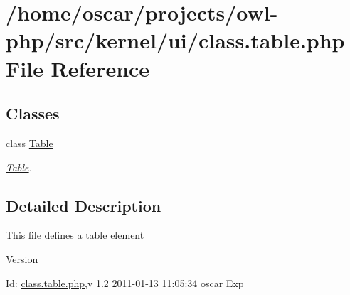 \section{/home/oscar/projects/owl-\/php/src/kernel/ui/class.table.php File Reference}
\label{class_8table_8php}
\subsection*{Classes}
\begin{DoxyCompactItemize}
\item 
class \hyperlink{classTable}{Table}
\begin{DoxyCompactList}\small\item\em \hyperlink{classTable}{Table}. \item\end{DoxyCompactList}\end{DoxyCompactItemize}


\subsection{Detailed Description}
This file defines a table element \begin{DoxyVersion}{Version}

\end{DoxyVersion}
\begin{DoxyParagraph}{Id:}
\hyperlink{class_8table_8php}{class.table.php},v 1.2 2011-\/01-\/13 11:05:34 oscar Exp 
\end{DoxyParagraph}
